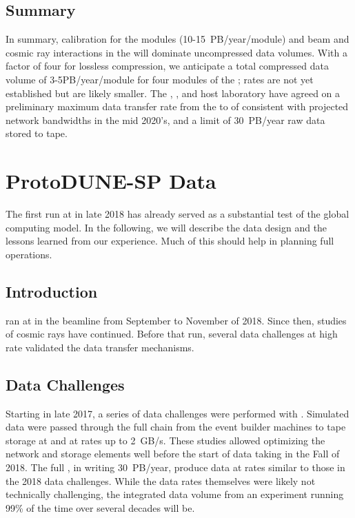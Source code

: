 \subsection{Summary}
\label{sec:exec-comp-summ}

In summary, calibration for the  modules (10-15~PB/year/module) and beam and cosmic ray interactions in the  will dominate uncompressed data volumes.  With a  factor of four for lossless compression, we anticipate a total compressed data volume of 3-5PB/year/module for four modules of the ;  rates are not yet established but are likely smaller.   
The ,   ,  and host laboratory %
have agreed on a preliminary maximum data transfer rate from the  to  of \surffnalbw consistent with projected network bandwidths in the mid 2020's, and a limit of \SI{30}{PB/year} raw data stored to tape. 

\section{ProtoDUNE-SP Data}
\label{sec:exec-comp-proto-SP}
The first   run at  in late 2018 has already served as a %
substantial test of the global computing model.  In the following, we will describe the  data design and the lessons learned from our experience. Much of this should help in planning full  operations. 

\subsection{Introduction}
\label{sec:exec-proto-intro}

 ran at  in the  beamline from September to November of 2018. Since then, studies of cosmic rays have continued. Before that run, several data challenges at high rate validated the data transfer mechanisms. 

\subsection{Data Challenges}

Starting in late 2017, a series of data challenges were performed with .  Simulated data were passed through the full chain from the event builder machines to tape storage at  and  at rates up to \SI{2}{GB/s}.  These studies allowed optimizing the network and storage elements well before the start of data taking in the Fall of 2018. 
The full  , in writing \SI{30}{PB/year}, produce data at rates similar to  those in the 2018 data challenges. While the data rates themselves were likely not technically challenging, the integrated data volume from an experiment running 99\% of the time over several decades will be. 

